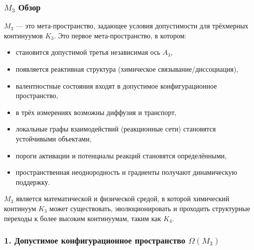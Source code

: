 

\subsubsection{\texorpdfstring{$M_3$}{M_3} Обзор}
\label{sec:m3-overview}

$M_3$ — это мета-пространство, задающее условия допустимости для
трёхмерных континуумов $K_3$.
Это первое мета-пространство, в котором:

\begin{itemize}
    \item становится допустимой третья независимая ось $A_3$,
    \item появляется реактивная структура (химическое связывание/диссоциация),
    \item валентностные состояния входят в допустимое конфигурационное пространство,
    \item в трёх измерениях возможны диффузия и транспорт,
    \item локальные графы взаимодействий (реакционные сети) становятся устойчивыми объектами,
    \item пороги активации и потенциалы реакций становятся определёнными,
    \item пространственная неоднородность и градиенты получают динамическую поддержку.
\end{itemize}

$M_3$ является математической и физической средой, в которой
химический континуум $K_3$ может существовать, эволюционировать и проходить
структурные переходы к более высоким континуумам, таким как $K_4$.

\subsubsection*{1. Допустимое конфигурационное пространство \texorpdfstring{$\Omega(M_3)$}{\Omega(M_3)}}


